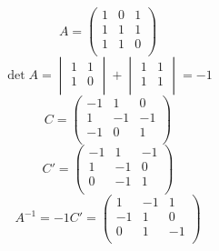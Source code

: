 \begin{example}
  $$
    A=
    \begin{pmatrix}
      1 & 0 & 1 \\
      1 & 1 & 1 \\
      1 & 1 & 0 \\
    \end{pmatrix}
  $$
  $$
    \det A=
    \begin{vmatrix}
      1 & 1 \\
      1 & 0 \\
    \end{vmatrix}
    +
    \begin{vmatrix}
      1 & 1 \\
      1 & 1 \\
    \end{vmatrix}
    =-1
  $$
  $$
    C=
    \begin{pmatrix}
      -1 & 1  & 0  \\
      1  & -1 & -1 \\
      -1 & 0  & 1  \\
    \end{pmatrix}
  $$
  $$
    C'=
    \begin{pmatrix}
      -1 & 1  & -1 \\
      1  & -1 & 0  \\
      0  & -1 & 1  \\
    \end{pmatrix}
  $$
  $$
    A^{-1}=-1C'=
    \begin{pmatrix}
      1  & -1 & 1  \\
      -1 & 1  & 0  \\
      0  & 1  & -1 \\
    \end{pmatrix}
  $$
\end{example}

